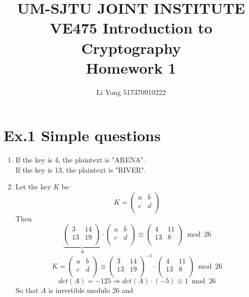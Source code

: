 \documentclass[a4paper]{article}
\title{UM-SJTU JOINT INSTITUTE\\VE475 Introduction to Cryptography\\\vspace{0.5cm} Homework 1}
\author{Li Yong 517370910222}
\begin{document}
\maketitle
\newpage

\section*{Ex.1 Simple questions}
	\begin{enumerate}
		\item
		If the key is 4, the plaintext is "ARENA".\\
		If the key is 13, the plaintext is "RIVER".
		\item
		Let the key $K$ be
		$$ K =
		\left(
		\begin{matrix}
			a & b \\
			c & d \\
		\end{matrix}
		\right)
		$$
		Then
		$$
		\underbrace{
		\left(
		\begin{matrix}
			3  & 14 \\
			13 & 19 \\
		\end{matrix}
		\right)}_{A}
		\cdot
		\left(
		\begin{matrix}
			a & b \\
			c & d \\
		\end{matrix}
		\right)
		\equiv
		\left(
		\begin{matrix}
			4  & 11 \\
			13 & 8 \\
		\end{matrix}
		\right)
		\bmod 26
		$$
		$$ K =
		\left(
		\begin{matrix}
			a & b \\
			c & d \\
		\end{matrix}
		\right)
		\equiv
		\left(
		\begin{matrix}
			3  & 14 \\
			13 & 19 \\
		\end{matrix}
		\right)^{-1}
		\cdot
		\left(
		\begin{matrix}
			4  & 11 \\
			13 & 8 \\
		\end{matrix}
		\right)
		\bmod 26
		$$
		$$det(A) = -125 \Rightarrow det(A)\cdot(-5) \equiv 1 \bmod 26
		$$
		So that $A$ is invertible modulo 26 and

\end{enumerate}
\end{document}

